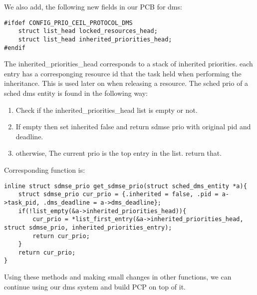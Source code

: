 \documentclass[12pt, letterpaper]{article}
\begin{document}
We also add, the following new fields in our PCB for dms: 
\begin{lstlisting}
#ifdef CONFIG_PRIO_CEIL_PROTOCOL_DMS
    struct list_head locked_resources_head;
    struct list_head inherited_priorities_head;
#endif
\end{lstlisting}
The inherited\_priorities\_head corresponds to a stack of inherited priorities. each entry has a corresponging resource id that the task held when performing the inheritance. This is used later on when 
releasing a resource. The sched prio of a sched dms entity is found in the following way:
\begin{enumerate}
    \item Check if the {\ttfamily inherited\_priorities\_head} list is empty or not.
    \item If empty then set inherited false and return sdmse prio with original pid and deadline.
    \item otherwise, The current prio is the top entry in the list. return that.
\end{enumerate}
Corresponding function is:
\begin{lstlisting}
inline struct sdmse_prio get_sdmse_prio(struct sched_dms_entity *a){
    struct sdmse_prio cur_prio = {.inherited = false, .pid = a->task_pid, .dms_deadline = a->dms_deadline};
    if(!list_empty(&a->inherited_priorities_head)){
        cur_prio = *list_first_entry(&a->inherited_priorities_head, struct sdmse_prio, inherited_priorities_entry);
        return cur_prio;
    }
    return cur_prio; 
}
\end{lstlisting}
Using these methods and making small changes in other functions, we can continue using our dms system and build PCP on top of it.
\end{document}
